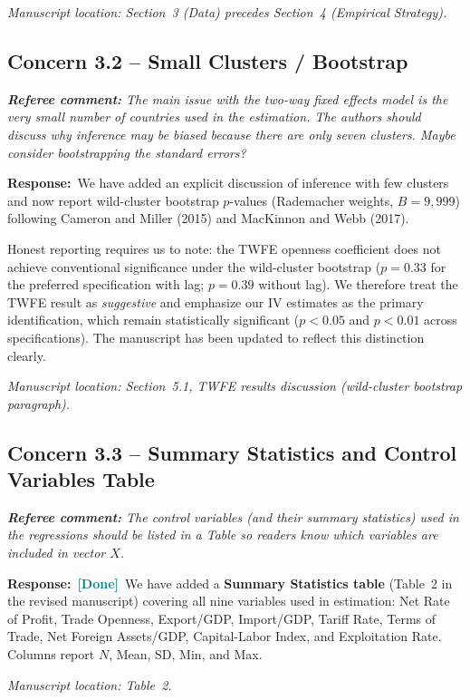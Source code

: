 \documentclass[11pt]{article}
\newcommand{\RC}[1]{\begin{refereebox}\textit{\textbf{Referee comment:} #1}\end{refereebox}}
\newcommand{\AR}{\noindent\textbf{Response:}\ }
\newcommand{\done}{\textcolor{teal}{\textbf{[Done]}}}
\begin{document}
\smallskip\noindent\textit{Manuscript location: Section~3 (Data) precedes Section~4 (Empirical Strategy).}

\subsection*{Concern 3.2 -- Small Clusters / Bootstrap}

\RC{The main issue with the two-way fixed effects model is the very small number of countries used in the estimation. The authors should discuss why inference may be biased because there are only seven clusters. Maybe consider bootstrapping the standard errors?}

\AR We have added an explicit discussion of inference with few clusters and now report wild-cluster bootstrap $p$-values (Rademacher weights, $B = 9{,}999$) following Cameron and Miller (2015) and MacKinnon and Webb (2017).

Honest reporting requires us to note: the TWFE openness coefficient does not achieve conventional significance under the wild-cluster bootstrap ($p = 0.33$ for the preferred specification with lag; $p = 0.39$ without lag). We therefore treat the TWFE result as \emph{suggestive} and emphasize our IV estimates as the primary identification, which remain statistically significant ($p < 0.05$ and $p < 0.01$ across specifications). The manuscript has been updated to reflect this distinction clearly.

\smallskip\noindent\textit{Manuscript location: Section~5.1, TWFE results discussion (wild-cluster bootstrap paragraph).}

\subsection*{Concern 3.3 -- Summary Statistics and Control Variables Table}

\RC{The control variables (and their summary statistics) used in the regressions should be listed in a Table so readers know which variables are included in vector $X$.}

\AR \done\ We have added a \textbf{Summary Statistics table} (Table~2 in the revised manuscript) covering all nine variables used in estimation: Net Rate of Profit, Trade Openness, Export/GDP, Import/GDP, Tariff Rate, Terms of Trade, Net Foreign Assets/GDP, Capital-Labor Index, and Exploitation Rate. Columns report $N$, Mean, SD, Min, and Max.

\smallskip\noindent\textit{Manuscript location: Table~2.}
\end{document}
